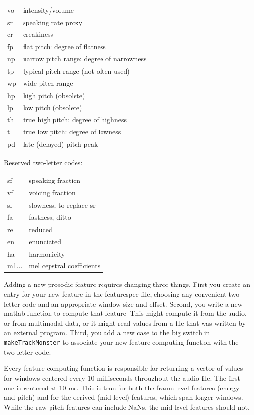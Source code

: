 \documentclass[11pt]{article}
\begin{document}
\begin{tabular}{ll}
  vo  & intensity/volume \\
  sr  & speaking rate proxy \\
  cr  & creakiness \\
  fp  & flat pitch: degree of flatness \\
  np  & narrow pitch range: degree of narrowness \\
  tp  & typical pitch range (not often used)\\
  wp  & wide pitch range  \\
  hp  & high pitch (obsolete) \\ 
  lp  & low pitch (obsolete) \\
  th  & true high pitch: degree of highness  \\ 
  tl  & true low pitch: degree of lowness \\
  pd  & late (delayed) pitch peak \\
\end{tabular}

Reserved two-letter codes: 

\begin{tabular}{ll}  
  sf      & speaking fraction \\
  vf      & voicing fraction \\
  sl      & slowness, to replace sr \\
  fa      & fastness, ditto\\
  re      & reduced \\
  en      & enunciated \\
  ha      & harmonicity \\
  m1...   & mel cepstral coefficients
\end{tabular}

Adding a new prosodic feature requires changing three things.  First
you create an entry for your new feature in the featurespec file,
choosing any convenient two-letter code and an appropriate window size
and offset.  Second, you write a new matlab function to compute that
feature.  This might compute it from the audio, or from multimodal
data, or it might read values from a file that was written by an
external program.  Third, you add a new case to the big switch in {\tt
  makeTrackMonster} to associate your new feature-computing function
with the two-letter code.

Every feature-computing function is responsible for returning a vector
of values for windows centered every 10 milliseconds throughout the
audio file.  The first one is centered at 10 ms.  This is true for
both the frame-level features (energy and pitch) and for the derived
(mid-level) features, which span longer windows.  While the raw pitch
features can include NaNs, the mid-level features should not.
\end{document}
